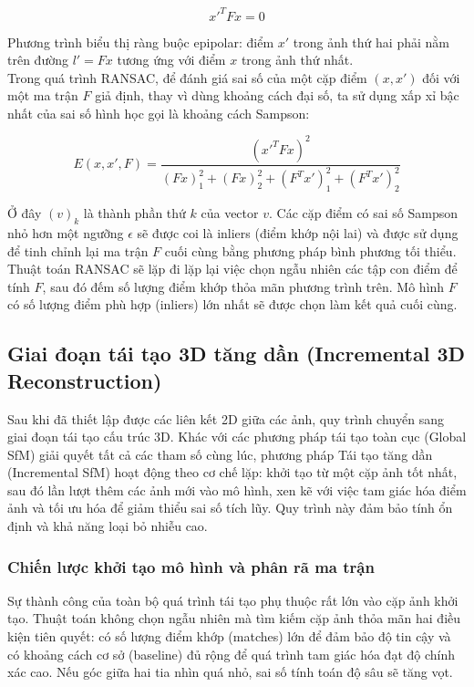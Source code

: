 $$x'^T F x = 0$$

Phương trình biểu thị ràng buộc epipolar: điểm $x'$ trong ảnh thứ hai phải nằm trên đường $l' = Fx$ tương ứng với điểm $x$ trong ảnh thứ nhất. \\

Trong quá trình RANSAC, để đánh giá sai số của một cặp điểm $(x, x')$ đối với một ma trận $F$ giả định, thay vì dùng khoảng cách đại số, ta sử dụng xấp xỉ bậc nhất của sai số hình học gọi là khoảng cách Sampson:

$$E(x, x', F) = \frac{(x'^T F x)^2}{(Fx)_1^2 + (Fx)_2^2 + (F^T x')_1^2 + (F^T x')_2^2}$$

Ở đây $(v)_k$ là thành phần thứ $k$ của vector $v$. Các cặp điểm có sai số Sampson nhỏ hơn một ngưỡng $\epsilon$ sẽ được coi là inliers (điểm khớp nội lai) và được sử dụng để tinh chỉnh lại ma trận $F$ cuối cùng bằng phương pháp bình phương tối thiểu. \\

Thuật toán RANSAC sẽ lặp đi lặp lại việc chọn ngẫu nhiên các tập con điểm để tính $F$, sau đó đếm số lượng điểm khớp thỏa mãn phương trình trên. Mô hình $F$ có số lượng điểm phù hợp (inliers) lớn nhất sẽ được chọn làm kết quả cuối cùng.

\subsection{Giai đoạn tái tạo 3D tăng dần (Incremental 3D Reconstruction)}

Sau khi đã thiết lập được các liên kết 2D giữa các ảnh, quy trình chuyển sang giai đoạn tái tạo cấu trúc 3D. Khác với các phương pháp tái tạo toàn cục (Global SfM) giải quyết tất cả các tham số cùng lúc, phương pháp Tái tạo tăng dần (Incremental SfM) hoạt động theo cơ chế lặp: khởi tạo từ một cặp ảnh tốt nhất, sau đó lần lượt thêm các ảnh mới vào mô hình, xen kẽ với việc tam giác hóa điểm ảnh và tối ưu hóa để giảm thiểu sai số tích lũy. Quy trình này đảm bảo tính ổn định và khả năng loại bỏ nhiễu cao.

\subsubsection{Chiến lược khởi tạo mô hình và phân rã ma trận}

Sự thành công của toàn bộ quá trình tái tạo phụ thuộc rất lớn vào cặp ảnh khởi tạo. Thuật toán không chọn ngẫu nhiên mà tìm kiếm cặp ảnh thỏa mãn hai điều kiện tiên quyết: có số lượng điểm khớp (matches) lớn để đảm bảo độ tin cậy và có khoảng cách cơ sở (baseline) đủ rộng để quá trình tam giác hóa đạt độ chính xác cao. Nếu góc giữa hai tia nhìn quá nhỏ, sai số tính toán độ sâu sẽ tăng vọt. \\

